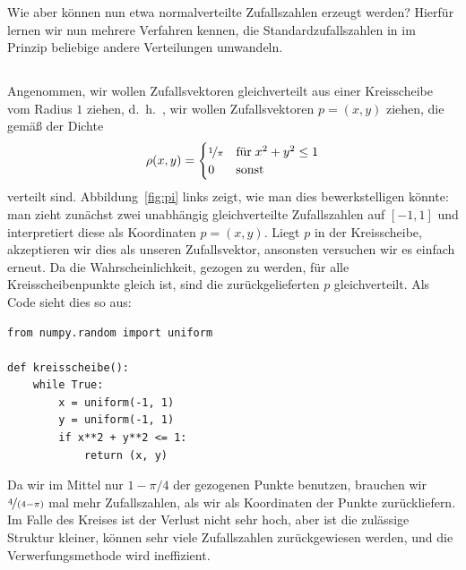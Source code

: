 Wie aber können nun etwa normalverteilte Zufallszahlen erzeugt werden?
Hierfür lernen wir nun mehrere Verfahren kennen, die
Standardzufallszahlen in im Prinzip beliebige andere Verteilungen
umwandeln.

\subsection{}

Angenommen, wir wollen Zufallsvektoren gleichverteilt aus einer
Kreisscheibe vom Radius $1$ ziehen, d.~h.~, wir wollen Zufallsvektoren
$p=(x,y)$ ziehen, die gemäß der Dichte
\begin{equation}
  \rho(x, y) = \begin{cases}
    \nicefrac{1}{\pi} & \text{für}\; x^2+y^2\le 1\\
    0     & \text{sonst}
  \end{cases}
\end{equation}
verteilt sind.  Abbildung~\ref{fig:pi} links zeigt, wie man dies
bewerkstelligen könnte: man zieht zunächst zwei unabhängig
gleichverteilte Zufallszahlen auf $[-1,1]$ und interpretiert diese als
Koordinaten $p = (x, y)$. Liegt $p$ in der Kreisscheibe, akzeptieren
wir dies als unseren Zufallsvektor, ansonsten versuchen wir es einfach
erneut. Da die Wahrscheinlichkeit, gezogen zu werden, für alle
Kreisscheibenpunkte gleich ist, sind die zurückgelieferten $p$
gleichverteilt. Als Code sieht dies so aus:
\begin{lstlisting}
from numpy.random import uniform

def kreisscheibe():
    while True:
        x = uniform(-1, 1)
        y = uniform(-1, 1)
        if x**2 + y**2 <= 1:
            return (x, y)
\end{lstlisting}
Da wir im Mittel nur $1-\pi/4$ der gezogenen Punkte benutzen, brauchen
wir $\nicefrac{4}{(4-\pi)}$ mal mehr Zufallszahlen, als wir als
Koordinaten der Punkte zurückliefern. Im Falle des Kreises ist der
Verlust nicht sehr hoch, aber ist die zulässige Struktur kleiner,
können sehr viele Zufallszahlen zurückgewiesen werden, und die
Verwerfungsmethode wird ineffizient.

